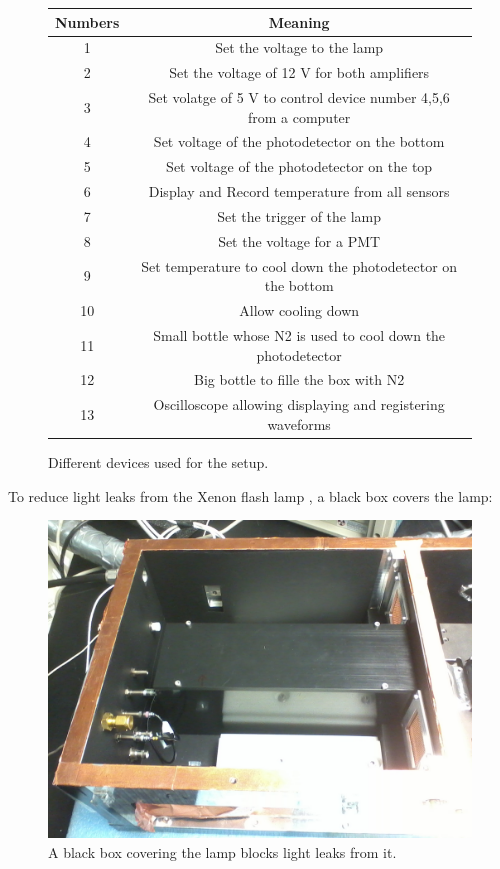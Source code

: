 \documentclass[a4paper, 11pt]{report}%
\newcommand{\xfl}{Xenon flash lamp }
\begin{document}
  \begin{figure}[!hbtp]
  \centering
  \begin{tabular}{|c|c|}
    \hline
    \bf Numbers & \bf Meaning \\
    \hline
    \hline
    1 & Set the voltage to the lamp  \\\hline
    2 & Set the voltage of 12 V for both amplifiers  \\\hline
    3 & Set volatge of 5 V to control device number 4,5,6 from a computer  \\\hline
    4 & Set voltage of the photodetector on the bottom  \\\hline
    5 & Set voltage of the photodetector on the top  \\\hline
    6 & Display and Record temperature from all sensors \\\hline
    7 & Set the trigger of the lamp \\\hline
    8 & Set the voltage for a PMT \\\hline
    9 & Set temperature to cool down the photodetector on the bottom  \\\hline
    10 & Allow cooling down  \\\hline
    11 & Small bottle whose N2 is used to cool down the photodetector \\\hline
    12 & Big bottle to fille the box with N2  \\\hline      
      13 & Oscilloscope allowing displaying and registering waveforms \\
    \hline
    \hline
  \end{tabular}
  \caption{Different devices used for the setup.}
  \label{fig:table_SiPM}
  \end{figure}
  
  To reduce light leaks from the  \xfl, a black box covers the lamp:
  
  \begin{figure}[!hbtp]
    \centering
    \includegraphics[totalheight=0.4\textwidth,trim=0cm 0cm 0cm 0cm, clip=true]{../Pictures/Pictures_Setup/black_box_lamp.jpg}
    \caption{A black box covering the lamp blocks light leaks from it.}
    \label{fig:black_box}
  \end{figure}
  
\end{document}
